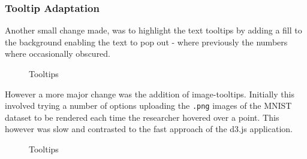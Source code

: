 \documentclass[a4paper,11pt,titlepage]{article}
\begin{document}
	\subsubsection{Tooltip Adaptation}
	Another small change made, was to highlight the text tooltips by adding a fill to the background enabling the text to pop out - where previously the numbers where occasionally obscured.
	\par 
	
	\begin{figure}[H]
    			\caption{Tooltips}%
	\end{figure}	
	
	However a more major change was the addition of image-tooltips. Initially this involved trying a number of options uploading the \texttt{.png} images of the MNIST dataset to be rendered each time the researcher hovered over a point. This however was slow and contrasted to the fast approach of the d3.js application. 
	
	\begin{figure}[H]
    			\caption{Tooltips}%
	\end{figure}	
	
\end{document}
